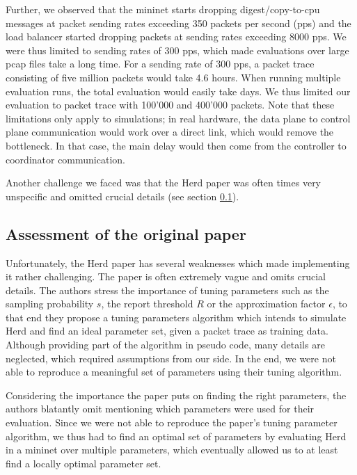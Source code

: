 \documentclass[11pt,oneside,a4paper]{article}
\begin{document}
Further, we observed that the mininet starts dropping digest/copy-to-cpu messages at packet sending rates exceeding 350 packets per second (pps) and the load balancer started dropping packets at sending rates exceeding 8000 pps. We were thus limited to sending rates of 300 pps, which made evaluations over large pcap files take a long time. For a sending rate of 300 pps, a packet trace consisting of five million packets would take 4.6 hours. When running multiple evaluation runs, the total evaluation would easily take days. We thus limited our evaluation to packet trace with 100'000 and 400'000 packets. Note that these limitations only apply to simulations; in real hardware, the data plane to control plane communication would work over a direct link, which would remove the bottleneck. In that case, the main delay would then come from the controller to coordinator communication. \newline 

\noindent Another challenge we faced was that the Herd paper \cite{anon2019herd} was often times very unspecific and omitted crucial details (see section \ref{original_paper}).


\subsection{Assessment of the original paper} \label{original_paper}

Unfortunately, the Herd paper \cite{anon2019herd} has several weaknesses which made implementing it rather challenging. The paper is often extremely vague and omits crucial details. The authors stress the importance of tuning parameters such as the sampling probability $s$, the report threshold $R$ or the approximation factor $\epsilon$, to that end they propose a tuning parameters algorithm which intends to simulate Herd and find an ideal parameter set, given a packet trace as training data. Although providing part of the algorithm in pseudo code, many details are neglected, which required assumptions from our side. In the end, we were not able to reproduce a meaningful set of parameters using their tuning algorithm.

Considering the importance the paper puts on finding the right parameters, the authors blatantly omit mentioning which parameters were used for their evaluation. Since we were not able to reproduce the paper's tuning parameter algorithm, we thus had to find an optimal set of parameters by evaluating Herd in a mininet over multiple parameters, which eventually allowed us to at least find a locally optimal parameter set.
\end{document}
